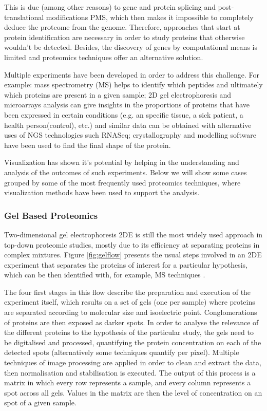 This is due (among other reasons) to gene and protein splicing and post-translational modifications PMS, which then makes it impossible to completely deduce the proteome from the genome. Therefore, approaches that start at protein identification are necessary in order to study proteins that otherwise wouldn't be detected. Besides, the discovery of genes by computational means is limited and proteomics techniques offer an alternative  solution.

Multiple experiments have been developed in order to address this challenge. For example: mass spectrometry (MS) helps to identify which peptides and ultimately which proteins are present in a given sample; 2D gel electrophoresis and microarrays analysis can give insights in the proportions of proteins that have been expressed in certain conditions (e.g. an specific tissue, a sick patient, a health person(control), etc.) and similar data can be obtained with alternative uses of NGS technologies such RNASeq; crystallography and modelling software have been used to find the final shape of the protein.

Visualization has shown it's potential by helping in the understanding and analysis of the outcomes of such experiments. Below we will show some cases grouped by some of the most frequently used proteomics techniques, where visualization methods have been used to support the analysis.

\subsubsection{Gel Based Proteomics}
Two-dimensional gel electrophoresis 2DE is still the most widely used approach in top-down proteomic studies, mostly due to its efficiency at separating proteins in complex mixtures. Figure \ref{fig:gelflow} presents the usual steps involved in an 2DE experiment that separates the proteins of interest for a particular hypothesis, which can be then identified with, for example, MS techniques \cite{SIL2014}.

The four first stages in this flow describe the preparation and execution of the experiment itself, which results on a set of gels (one per sample) where proteins are separated according to molecular size and isoelectric point. Conglomerations of proteins are then exposed as darker spots. In order to analyse the relevance of the different proteins to the hypothesis of the particular study, the gels need to be digitalised and processed, quantifying the protein concentration on each of the detected spots (alternatively some techniques quantify per pixel). Multiple techniques of image processing are applied in order to clean and extract the data, then normalisation and stabilisation is executed. The output of this process is a matrix in which every row represents a sample, and every column represents a spot across all gels. Values in the matrix are then the level of concentration on an spot of a given sample. 

